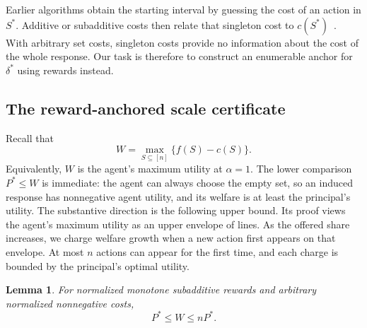 \documentclass[11pt]{article}
\newtheorem{lemma}[lemma]{Lemma}
\begin{document}
Earlier algorithms obtain the starting interval by guessing the cost of an
action in $S^*$.  Additive or subadditive costs then relate that singleton
cost to $c(S^*)$~\cite{DEFK25,DFGR26}.  With arbitrary set costs, singleton
costs provide no information about the cost of the whole response.  Our task
is therefore to construct an enumerable anchor for $\delta^*$ using rewards
instead.

\subsection{The reward-anchored scale certificate}

Recall that
\[
           W=\max_{S\subseteq[n]}\{f(S)-c(S)\}.
\]
Equivalently, $W$ is the agent's maximum utility at $\alpha=1$.
The lower comparison $P^*\leq W$ is immediate: the agent can always choose
the empty set, so an induced response has nonnegative agent utility, and its
welfare is at least the principal's utility.  The substantive direction is
the following upper bound.  Its proof views the agent's maximum utility as
an upper envelope of lines.  As the offered share increases, we charge
welfare growth when a new action first appears on that envelope.  At most
$n$ actions can appear for the first time, and each charge is bounded by the
principal's optimal utility.

\begin{lemma}\label{lem:welfare}
For normalized monotone subadditive rewards and arbitrary normalized
nonnegative costs,
\[
                         P^*\leq W\leq nP^*.
\]
\end{lemma}
\end{document}
